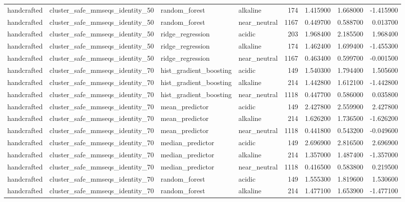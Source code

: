 \begin{longtable}{llllrrrr}
handcrafted & cluster\_safe\_mmseqs\_identity\_50 & random\_forest & alkaline & 174 & 1.415900 & 1.668000 & -1.415900 \\
handcrafted & cluster\_safe\_mmseqs\_identity\_50 & random\_forest & near\_neutral & 1167 & 0.449700 & 0.588700 & 0.013700 \\
handcrafted & cluster\_safe\_mmseqs\_identity\_50 & ridge\_regression & acidic & 203 & 1.968400 & 2.185500 & 1.968400 \\
handcrafted & cluster\_safe\_mmseqs\_identity\_50 & ridge\_regression & alkaline & 174 & 1.462400 & 1.699400 & -1.455300 \\
handcrafted & cluster\_safe\_mmseqs\_identity\_50 & ridge\_regression & near\_neutral & 1167 & 0.463400 & 0.599700 & -0.001500 \\
handcrafted & cluster\_safe\_mmseqs\_identity\_70 & hist\_gradient\_boosting & acidic & 149 & 1.540300 & 1.794400 & 1.505600 \\
handcrafted & cluster\_safe\_mmseqs\_identity\_70 & hist\_gradient\_boosting & alkaline & 214 & 1.442800 & 1.612100 & -1.442800 \\
handcrafted & cluster\_safe\_mmseqs\_identity\_70 & hist\_gradient\_boosting & near\_neutral & 1118 & 0.447700 & 0.586000 & 0.035800 \\
handcrafted & cluster\_safe\_mmseqs\_identity\_70 & mean\_predictor & acidic & 149 & 2.427800 & 2.559900 & 2.427800 \\
handcrafted & cluster\_safe\_mmseqs\_identity\_70 & mean\_predictor & alkaline & 214 & 1.626200 & 1.736500 & -1.626200 \\
handcrafted & cluster\_safe\_mmseqs\_identity\_70 & mean\_predictor & near\_neutral & 1118 & 0.441800 & 0.543200 & -0.049600 \\
handcrafted & cluster\_safe\_mmseqs\_identity\_70 & median\_predictor & acidic & 149 & 2.696900 & 2.816500 & 2.696900 \\
handcrafted & cluster\_safe\_mmseqs\_identity\_70 & median\_predictor & alkaline & 214 & 1.357000 & 1.487400 & -1.357000 \\
handcrafted & cluster\_safe\_mmseqs\_identity\_70 & median\_predictor & near\_neutral & 1118 & 0.416500 & 0.583800 & 0.219500 \\
handcrafted & cluster\_safe\_mmseqs\_identity\_70 & random\_forest & acidic & 149 & 1.555300 & 1.819600 & 1.530600 \\
handcrafted & cluster\_safe\_mmseqs\_identity\_70 & random\_forest & alkaline & 214 & 1.477100 & 1.653900 & -1.477100 \\

\end{longtable}
